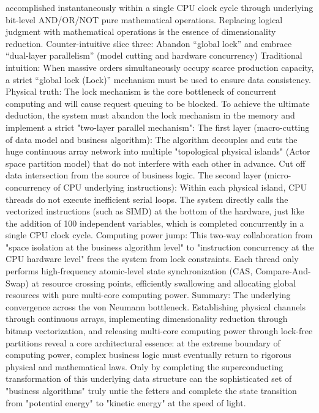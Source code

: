 \documentclass[11pt,a4paper]{article}
\begin{document}
accomplished instantaneously within a single CPU clock cycle through underlying bit-level AND/OR/NOT pure mathematical operations. Replacing logical judgment with mathematical operations is the essence of dimensionality reduction. Counter-intuitive slice three: Abandon “global lock” and embrace “dual-layer parallelism” (model cutting and hardware concurrency) Traditional intuition: When massive orders simultaneously occupy scarce production capacity, a strict “global lock (Lock)” mechanism must be used to ensure data consistency. Physical truth: The lock mechanism is the core bottleneck of concurrent computing and will cause request queuing to be blocked. To achieve the ultimate deduction, the system must abandon the lock mechanism in the memory and implement a strict "two-layer parallel mechanism": The first layer (macro-cutting of data model and business algorithm): The algorithm decouples and cuts the huge continuous array network into multiple "topological physical islands" (Actor space partition model) that do not interfere with each other in advance. Cut off data intersection from the source of business logic. The second layer (micro-concurrency of CPU underlying instructions): Within each physical island, CPU threads do not execute inefficient serial loops. The system directly calls the vectorized instructions (such as SIMD) at the bottom of the hardware, just like the addition of 100 independent variables, which is completed concurrently in a single CPU clock cycle. Computing power jump: This two-way collaboration from "space isolation at the business algorithm level" to "instruction concurrency at the CPU hardware level" frees the system from lock constraints. Each thread only performs high-frequency atomic-level state synchronization (CAS, Compare-And-Swap) at resource crossing points, efficiently swallowing and allocating global resources with pure multi-core computing power. Summary: The underlying convergence across the von Neumann bottleneck. Establishing physical channels through continuous arrays, implementing dimensionality reduction through bitmap vectorization, and releasing multi-core computing power through lock-free partitions reveal a core architectural essence: at the extreme boundary of computing power, complex business logic must eventually return to rigorous physical and mathematical laws. Only by completing the superconducting transformation of this underlying data structure can the sophisticated set of "business algorithms" truly untie the fetters and complete the state transition from "potential energy" to "kinetic energy" at the speed of light.
\end{document}
